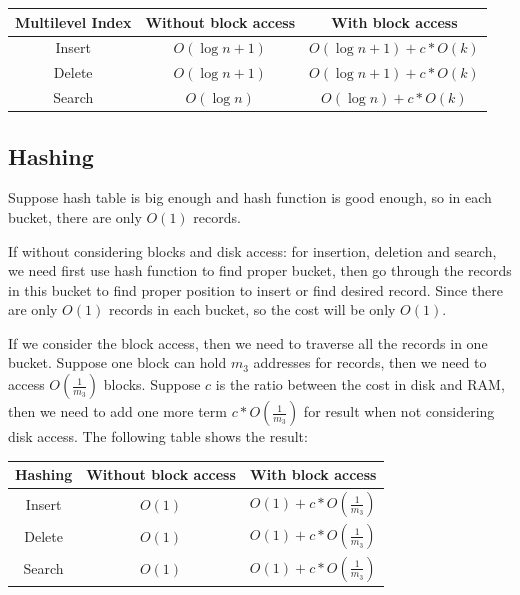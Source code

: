 \documentclass{article}
\begin{document}
 \begin{tabular}{|c|c|c|}
  \hline
  Multilevel Index & Without block access    & With block access \\ \hline
  Insert           & $O(\log{n}+1)$ & $O(\log{n}+1)+c*O(k)$  \\ \hline
  Delete           & $O(\log{n}+1)$ & $O(\log{n}+1)+c*O(k)$ \\ \hline
  Search           & $O(\log{n})$   & $O(\log{n})+c*O(k)$ \\ \hline
 \end{tabular}

\goodbreak

\subsection{Hashing}

Suppose hash table is big enough and hash function is good enough, so in each bucket, there are only $O(1)$ records.

If without considering blocks and disk access: for insertion, deletion and search, we need first use hash function to find proper bucket, then go through the records in this bucket to find proper position to insert or find desired record. Since there are only $O(1)$ records in each bucket, so the cost will be only $O(1)$.

If we consider the block access, then we need to traverse all the records in one bucket. Suppose one block can hold $m_{3}$ addresses for records, then we need to access $O(\frac{1}{m_{3}})$ blocks. Suppose $c$ is the ratio between the cost in disk and RAM, then we need to add one more term $c*O(\frac{1}{m_{3}})$ for result when not considering disk access. The following table shows the result:

 \begin{tabular}{|c|c|c|}
  \hline
  Hashing          & Without block access & With block access \\ \hline
  Insert           & $O(1)$               & $O(1)+c*O(\frac{1}{m_{3}})$  \\ \hline
  Delete           & $O(1)$               & $O(1)+c*O(\frac{1}{m_{3}})$ \\ \hline
  Search           & $O(1)$               & $O(1)+c*O(\frac{1}{m_{3}})$ \\ \hline
 \end{tabular}
\end{document}
